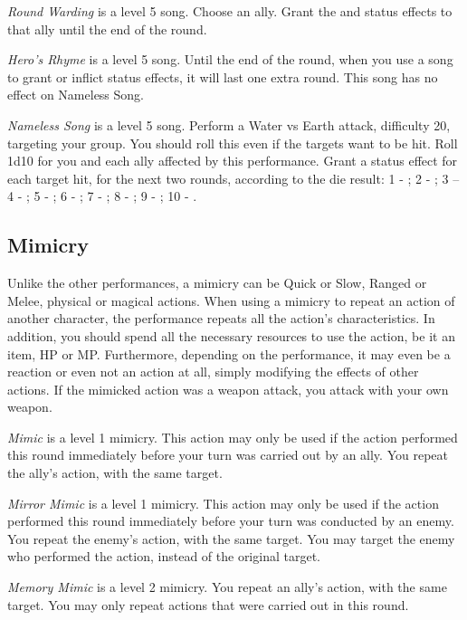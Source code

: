 \begin{multicols}{2}
    \textit{Round Warding} is a level 5 song. Choose an ally. Grant the  and  status effects to that ally until the end of the round.
    
	\textit{Hero's Rhyme} is a level 5 song. Until the end of the round, when you use a song to grant or inflict status effects, it will last one extra round. This song has no effect on Nameless Song.
    
    \textit{Nameless Song} is a level 5 song. Perform a Water vs Earth attack, difficulty 20, targeting your group. You should roll this even if the targets want to be hit. Roll 1d10 for you and each ally affected by this performance. Grant a status effect for each target hit, for the next two rounds, according to the die result: 1 - ; 2 - ; 3 –  4 - ; 5 - ; 6 - ; 7 - ; 8 - ; 9 - ; 10 - .
 
    \subsection{Mimicry}\label{subsec:perf-mimicry}

	Unlike the other performances, a mimicry can be Quick or Slow, Ranged or Melee, physical or magical actions. When using a mimicry to repeat an action of another character, the performance repeats all the action’s characteristics. In addition, you should spend all the necessary resources to use the action, be it an item, HP or MP. Furthermore, depending on the performance, it may even be a reaction or even not an action at all, simply modifying the effects of other actions. If the mimicked action was a weapon attack, you attack with your own weapon.
    
    \textit{Mimic} is a level 1 mimicry. This action may only be used if the action performed this round immediately before your turn was carried out by an ally. You repeat the ally’s action, with the same target.
    
    \textit{Mirror Mimic} is a level 1 mimicry. This action may only be used if the action performed this round immediately before your turn was conducted by an enemy. You repeat the enemy’s action, with the same target. You may target the enemy who performed the action, instead of the original target.
    
    \textit{Memory Mimic} is a level 2 mimicry. You repeat an ally’s action, with the same target. You may only repeat actions that were carried out in this round.


\end{multicols}
